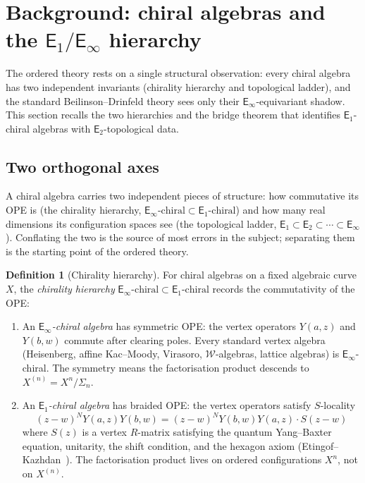 \documentclass[11pt,reqno]{amsart}
\theoremstyle{definition}
\newtheorem{definition}[theorem]{Definition}
\theoremstyle{remark}
\newcommand{\cW}{\mathcal{W}}
\newcommand{\Eone}{\mathsf{E}_{1}}
\newcommand{\Etwo}{\mathsf{E}_{2}}
\newcommand{\Einf}{\mathsf{E}_{\infty}}
\numberwithin{equation}{section}
\begin{document}
\section{Background: chiral algebras and the $\Eone/\Einf$
hierarchy}
\label{sec:background}

The ordered theory rests on a single structural observation:
every chiral algebra has two independent invariants (chirality
hierarchy and topological ladder), and the standard
Beilinson--Drinfeld theory sees only their $\Einf$-equivariant
shadow. This section recalls the two hierarchies and the
bridge theorem that identifies $\Eone$-chiral algebras with
$\Etwo$-topological data.

\subsection{Two orthogonal axes}
\label{subsec:two-axes}

A chiral algebra carries two independent pieces of structure:
how commutative its OPE is (the chirality hierarchy,
$\Einf\text{-chiral} \subset \Eone\text{-chiral}$) and how many
real dimensions its configuration spaces see (the
topological ladder, $\Eone \subset \Etwo \subset \cdots
\subset \Einf$). Conflating the two is the source of most
errors in the subject; separating them is the starting
point of the ordered theory.

\begin{definition}[Chirality hierarchy]
\label{def:chirality-hierarchy}
For chiral algebras on a fixed algebraic curve $X$,
the \emph{chirality hierarchy}
$\Einf\text{-chiral} \subset
 \Eone\text{-chiral}$
records the commutativity of the OPE:
\begin{enumerate}[label=\textup{(\roman*)}]
\item An $\Einf$\emph{-chiral algebra} has symmetric OPE:
  the vertex operators $Y(a,z)$ and $Y(b,w)$ commute
  after clearing poles. Every standard vertex algebra
  (Heisenberg, affine Kac--Moody, Virasoro,
  $\cW$-algebras, lattice algebras) is
  $\Einf$-chiral. The symmetry means the factorisation
  product descends to $X^{(n)} = X^n / \Sigma_n$.
\item An $\Eone$\emph{-chiral algebra} has braided OPE:
  the vertex operators satisfy $S$-locality
  \begin{equation}\label{eq:s-locality}
    (z - w)^N Y(a,z) Y(b,w)
    = (z - w)^N Y(b,w) Y(a,z) \cdot S(z - w)
  \end{equation}
  where $S(z)$ is a vertex $R$-matrix satisfying the
  quantum Yang--Baxter equation, unitarity, the shift
  condition, and the hexagon axiom
  \textup{(}Etingof--Kazhdan~\cite{EK00}\textup{)}.
  The factorisation product lives on ordered
  configurations $X^n$, not on $X^{(n)}$.
\end{enumerate}
\end{definition}
\end{document}
